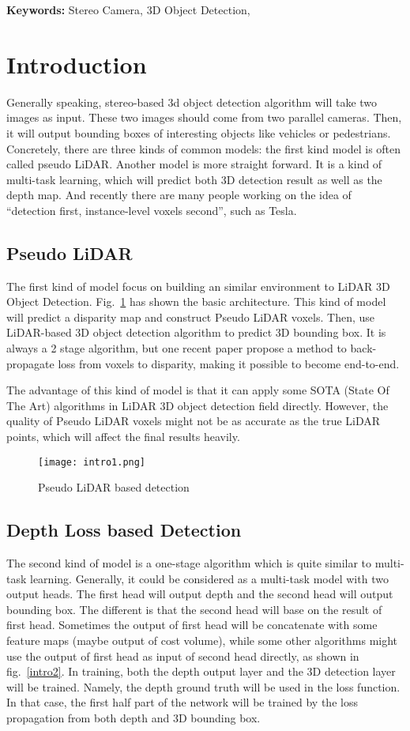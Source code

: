 \documentclass[12pt]{article}
\begin{document}
\textbf{Keywords:} Stereo Camera, 3D Object Detection, 

\section{Introduction}
Generally speaking, stereo-based 3d object detection algorithm will take two images as input. These two images should come from two parallel cameras. Then, it will output bounding boxes of interesting objects like vehicles or pedestrians. Concretely, there are three kinds of common models: the first kind model is often called pseudo LiDAR. Another model is more straight forward. It is a kind of multi-task learning, which will predict both 3D detection result as well as the depth map. And recently there are many people working on the idea of “detection first, instance-level voxels second”, such as Tesla. 
\subsection{Pseudo LiDAR}
The first kind of model focus on building an similar environment to LiDAR 3D Object Detection. Fig.~\ref{intro1} has shown the basic architecture. This kind of model will predict a disparity map and construct Pseudo LiDAR voxels. Then, use LiDAR-based 3D object detection algorithm to predict 3D bounding box. It is always a 2 stage algorithm, but one recent paper\cite{DBLP:journals/corr/abs-2004-03080} propose a method to back-propagate loss from voxels to disparity, making it possible to become end-to-end. 

The advantage of this kind of model is that it can apply some SOTA (State Of The Art) algorithms in LiDAR 3D object detection field directly. However, the quality of Pseudo LiDAR voxels might not be as accurate as the true LiDAR points, which will affect the final results heavily.
\begin{figure}[H]
    \centering
    \texttt{[image: intro1.png]}
    \caption{Pseudo LiDAR based detection}
    \label{intro1}
\end{figure}
\subsection{Depth Loss based Detection}
The second kind of model is a one-stage algorithm which is quite similar to multi-task learning. Generally, it could be considered as a multi-task model with two output heads. The first head will output depth and the second head will output bounding box. The different is that the second head will base on the result of first head. Sometimes the output of first head will be concatenate with some feature maps (maybe output of cost volume), while some other algorithms might use the output of first head as input of second head directly, as shown in fig.~\ref{intro2}. In training, both the depth output layer and the 3D detection layer will be trained. Namely, the depth ground truth will be used in the loss function. In that case, the first half part of the network will be trained by the loss propagation from both depth and 3D bounding box.
\end{document}
